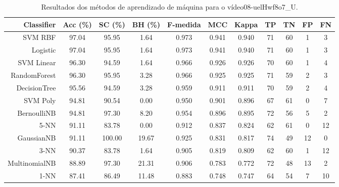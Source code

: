 \begin{table}[!htb]
\centering
\caption{Resultados dos métodos de aprendizado de máquina para o vídeo08-uelHwf8o7_U.}
\label{tab:08-uelHwf8o7_U}
\begin{tabular}{r|c|c|c|c|c|c|c|c|c|c}
\hline\hline
Classifier & Acc (\%) & SC (\%) & BH (\%) & F-medida & MCC & Kappa & TP & TN & FP & FN \\ \hline
SVM RBF & 97.04 & 95.95 & 1.64 & 0.973 & 0.941 & 0.940 & 71 & 60 & 1 & 3 \\ 
Logistic & 97.04 & 95.95 & 1.64 & 0.973 & 0.941 & 0.940 & 71 & 60 & 1 & 3 \\ 
SVM Linear & 96.30 & 94.59 & 1.64 & 0.966 & 0.926 & 0.926 & 70 & 60 & 1 & 4 \\ 
RandomForest & 96.30 & 95.95 & 3.28 & 0.966 & 0.925 & 0.925 & 71 & 59 & 2 & 3 \\ 
DecisionTree & 95.56 & 94.59 & 3.28 & 0.959 & 0.911 & 0.911 & 70 & 59 & 2 & 4 \\ 
SVM Poly & 94.81 & 90.54 & 0.00 & 0.950 & 0.901 & 0.896 & 67 & 61 & 0 & 7 \\ 
BernoulliNB & 94.81 & 97.30 & 8.20 & 0.954 & 0.896 & 0.895 & 72 & 56 & 5 & 2 \\ 
5-NN & 91.11 & 83.78 & 0.00 & 0.912 & 0.837 & 0.824 & 62 & 61 & 0 & 12 \\ 
GaussianNB & 91.11 & 100.00 & 19.67 & 0.925 & 0.831 & 0.817 & 74 & 49 & 12 & 0 \\ 
3-NN & 90.37 & 83.78 & 1.64 & 0.905 & 0.819 & 0.809 & 62 & 60 & 1 & 12 \\ 
MultinomialNB & 88.89 & 97.30 & 21.31 & 0.906 & 0.783 & 0.772 & 72 & 48 & 13 & 2 \\ 
1-NN & 87.41 & 86.49 & 11.48 & 0.883 & 0.748 & 0.747 & 64 & 54 & 7 & 10 \\ 
\hline\hline
\end{tabular}
\end{table}
